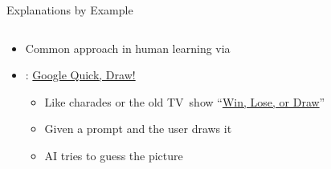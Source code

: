 \documentclass[11pt,dvipsnames,usenames,aspectratio=169]{beamer}  %
\begin{document}
\begin{frame}{Explanations by Example}{}
  \begin{columns}
    \begin{column}{0.45\textwidth}
      \begin{itemize}
        \setlength{\itemsep}{22pt}
        \item Common approach in human learning via 
        \item {}: \href{https://quickdraw.withgoogle.com/}{Google Quick, Draw!}~\citep{Cai:2019}
          \begin{itemize}
          \setlength{\itemsep}{8pt}
            \item Like charades or the old TV~show ``\href{https://en.wikipedia.org/wiki/Win,_Lose_or_Draw}{Win, Lose, or Draw}''
            \item Given a prompt and the user draws it
            \item AI tries to guess the picture
          \end{itemize}
      \end{itemize}
    \end{column}
    \begin{column}{0.1\textwidth}
    \end{column}
    \begin{column}{0.45\textwidth}
    \end{column}
  \end{columns}
\end{frame}
\end{document}
